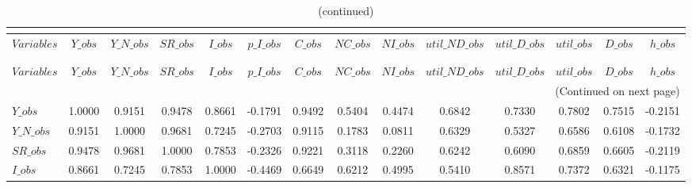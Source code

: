  
\begin{center}
\begin{longtable}{lccccccccccccc} 
\caption{MATRIX OF CORRELATIONS}\\
 \label{Table:th_corr_matrix}\\
\toprule 
$Variables      $	 & 	 $          Y\_obs$	 & 	 $      Y\_N\_obs$	 & 	 $         SR\_obs$	 & 	 $          I\_obs$	 & 	 $      p\_I\_obs$	 & 	 $          C\_obs$	 & 	 $         NC\_obs$	 & 	 $         NI\_obs$	 & 	 $  util\_ND\_obs$	 & 	 $   util\_D\_obs$	 & 	 $       util\_obs$	 & 	 $          D\_obs$	 & 	 $          h\_obs$\\
\midrule \endfirsthead 
\caption{(continued)}\\
 \toprule \\ 
$Variables      $	 & 	 $          Y\_obs$	 & 	 $      Y\_N\_obs$	 & 	 $         SR\_obs$	 & 	 $          I\_obs$	 & 	 $      p\_I\_obs$	 & 	 $          C\_obs$	 & 	 $         NC\_obs$	 & 	 $         NI\_obs$	 & 	 $  util\_ND\_obs$	 & 	 $   util\_D\_obs$	 & 	 $       util\_obs$	 & 	 $          D\_obs$	 & 	 $          h\_obs$\\
\midrule \endhead 
\midrule \multicolumn{14}{r}{(Continued on next page)} \\ \bottomrule \endfoot 
\bottomrule \endlastfoot 
$Y\_obs         $	 & 	           1.0000	 & 	           0.9151	 & 	           0.9478	 & 	           0.8661	 & 	          -0.1791	 & 	           0.9492	 & 	           0.5404	 & 	           0.4474	 & 	           0.6842	 & 	           0.7330	 & 	           0.7802	 & 	           0.7515	 & 	          -0.2151 \\ 
$Y\_N\_obs      $	 & 	           0.9151	 & 	           1.0000	 & 	           0.9681	 & 	           0.7245	 & 	          -0.2703	 & 	           0.9115	 & 	           0.1783	 & 	           0.0811	 & 	           0.6329	 & 	           0.5327	 & 	           0.6586	 & 	           0.6108	 & 	          -0.1732 \\ 
$SR\_obs        $	 & 	           0.9478	 & 	           0.9681	 & 	           1.0000	 & 	           0.7853	 & 	          -0.2326	 & 	           0.9221	 & 	           0.3118	 & 	           0.2260	 & 	           0.6242	 & 	           0.6090	 & 	           0.6859	 & 	           0.6605	 & 	          -0.2119 \\ 
$I\_obs         $	 & 	           0.8661	 & 	           0.7245	 & 	           0.7853	 & 	           1.0000	 & 	          -0.4469	 & 	           0.6649	 & 	           0.6212	 & 	           0.4995	 & 	           0.5410	 & 	           0.8571	 & 	           0.7372	 & 	           0.6321	 & 	          -0.1175 \\ 

\end{longtable}
\end{center}

